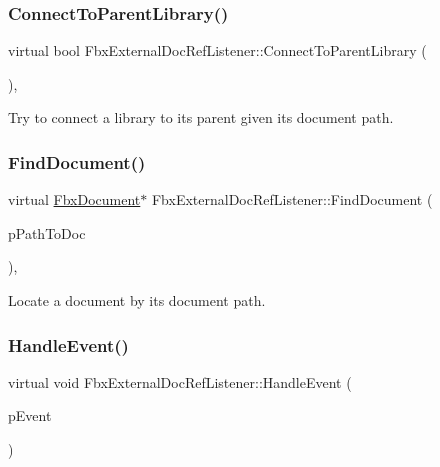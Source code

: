 \subsubsection{\texorpdfstring{Connect\+To\+Parent\+Library()}{ConnectToParentLibrary()}}
{\footnotesize\ttfamily virtual bool Fbx\+External\+Doc\+Ref\+Listener\+::\+Connect\+To\+Parent\+Library (\begin{DoxyParamCaption}\item[{const \hyperlink{struct_fbx_external_document_info}{Fbx\+External\+Document\+Info} \&}]{ }\end{DoxyParamCaption})\hspace{0.3cm}{\ttfamily [protected]}, {\ttfamily [virtual]}}



Try to connect a library to its parent given its document path. 

\mbox{\label{class_fbx_external_doc_ref_listener_a945c6cf13ded5425201a557a66f18723}} 
\subsubsection{\texorpdfstring{Find\+Document()}{FindDocument()}}
{\footnotesize\ttfamily virtual \hyperlink{class_fbx_document}{Fbx\+Document}$\ast$ Fbx\+External\+Doc\+Ref\+Listener\+::\+Find\+Document (\begin{DoxyParamCaption}\item[{const \hyperlink{class_fbx_string}{Fbx\+String} \&}]{p\+Path\+To\+Doc }\end{DoxyParamCaption})\hspace{0.3cm}{\ttfamily [protected]}, {\ttfamily [virtual]}}



Locate a document by its document path. 

\mbox{\label{class_fbx_external_doc_ref_listener_ab1517a34510c213bad2750763b502a88}} 
\subsubsection{\texorpdfstring{Handle\+Event()}{HandleEvent()}}
{\footnotesize\ttfamily virtual void Fbx\+External\+Doc\+Ref\+Listener\+::\+Handle\+Event (\begin{DoxyParamCaption}\item[{const \hyperlink{class_fbx_event_referenced_document}{Fbx\+Event\+Referenced\+Document} $\ast$}]{p\+Event }\end{DoxyParamCaption})\hspace{0.3cm}{\ttfamily [virtual]}}

